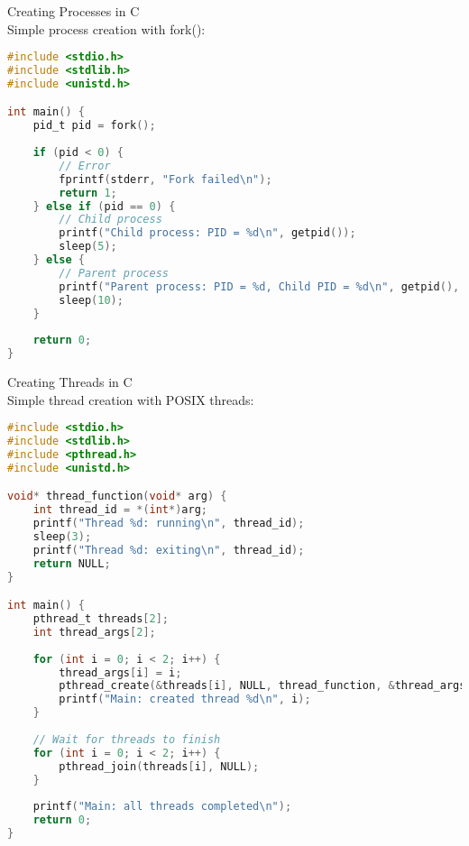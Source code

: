 \multend

\begin{example2}{Creating Processes in C}\\
    Simple process creation with fork():
    
\begin{lstlisting}[language=C, style=basesmol]
#include <stdio.h>
#include <stdlib.h>
#include <unistd.h>

int main() {
    pid_t pid = fork();
    
    if (pid < 0) {
        // Error
        fprintf(stderr, "Fork failed\n");
        return 1;
    } else if (pid == 0) {
        // Child process
        printf("Child process: PID = %d\n", getpid());
        sleep(5);
    } else {
        // Parent process
        printf("Parent process: PID = %d, Child PID = %d\n", getpid(), pid);
        sleep(10);
    }
    
    return 0;
}
\end{lstlisting}
\end{example2}

\begin{example2}{Creating Threads in C}\\
    Simple thread creation with POSIX threads:
    
\begin{lstlisting}[language=C, style=basesmol]
#include <stdio.h>
#include <stdlib.h>
#include <pthread.h>
#include <unistd.h>

void* thread_function(void* arg) {
    int thread_id = *(int*)arg;
    printf("Thread %d: running\n", thread_id);
    sleep(3);
    printf("Thread %d: exiting\n", thread_id);
    return NULL;
}

int main() {
    pthread_t threads[2];
    int thread_args[2];
    
    for (int i = 0; i < 2; i++) {
        thread_args[i] = i;
        pthread_create(&threads[i], NULL, thread_function, &thread_args[i]);
        printf("Main: created thread %d\n", i);
    }
    
    // Wait for threads to finish
    for (int i = 0; i < 2; i++) {
        pthread_join(threads[i], NULL);
    }
    
    printf("Main: all threads completed\n");
    return 0;
}
\end{lstlisting}
\end{example2}